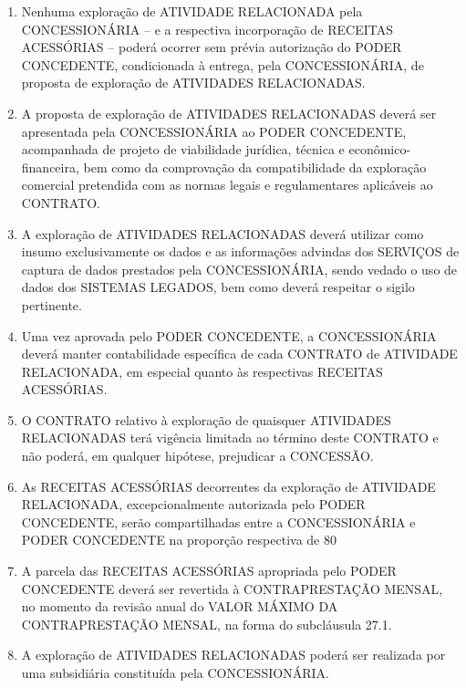 \documentclass[a4paper,11pt]{report} %
\begin{document}
\begin{enumerate}
\item \label{itm:NHSJ} Nenhuma exploração de ATIVIDADE RELACIONADA pela CONCESSIONÁRIA – e a respectiva incorporação de RECEITAS ACESSÓRIAS – poderá ocorrer sem prévia autorização do PODER CONCEDENTE, condicionada à entrega, pela CONCESSIONÁRIA, de proposta de exploração de ATIVIDADES RELACIONADAS.

\item \label{itm:G7AA} A proposta de exploração de ATIVIDADES RELACIONADAS deverá ser apresentada pela CONCESSIONÁRIA ao PODER CONCEDENTE, acompanhada de projeto de viabilidade jurídica, técnica e econômico-financeira, bem como da comprovação da compatibilidade da exploração comercial pretendida com as normas legais e regulamentares aplicáveis ao CONTRATO.

\item \label{itm:9VGS} A exploração de ATIVIDADES RELACIONADAS deverá utilizar como insumo exclusivamente os dados e as informações advindas dos SERVIÇOS de captura de dados prestados pela CONCESSIONÁRIA, sendo vedado o uso de dados dos SISTEMAS LEGADOS, bem como deverá respeitar o sigilo pertinente.

\item \label{itm:DETW} Uma vez aprovada pelo PODER CONCEDENTE, a CONCESSIONÁRIA deverá manter contabilidade específica de cada CONTRATO de ATIVIDADE RELACIONADA, em especial quanto às respectivas RECEITAS ACESSÓRIAS.

\item \label{itm:6EBY} O CONTRATO relativo à exploração de quaisquer ATIVIDADES RELACIONADAS terá vigência limitada ao término deste CONTRATO e não poderá, em qualquer hipótese, prejudicar a CONCESSÃO.

\item \label{itm:RFNL} As RECEITAS ACESSÓRIAS decorrentes da exploração de ATIVIDADE RELACIONADA, excepcionalmente autorizada pelo PODER CONCEDENTE, serão compartilhadas entre a CONCESSIONÁRIA e PODER CONCEDENTE na proporção respectiva de 80%

\item \label{itm:PRG8} A parcela das RECEITAS ACESSÓRIAS apropriada pelo PODER CONCEDENTE deverá ser revertida à CONTRAPRESTAÇÃO MENSAL, no momento da revisão anual do VALOR MÁXIMO DA CONTRAPRESTAÇÃO MENSAL, na forma do subcláusula 27.1.

\item \label{itm:APDW} A exploração de ATIVIDADES RELACIONADAS poderá ser realizada por uma subsidiária constituída pela CONCESSIONÁRIA.
\end{enumerate}
\end{document}
